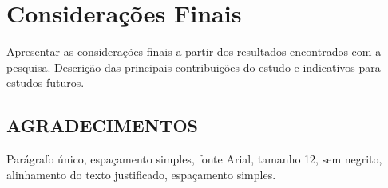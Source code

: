 \section{Considerações Finais}

Apresentar as considerações finais a partir dos resultados encontrados com a pesquisa. Descrição das principais contribuições do estudo e indicativos para estudos futuros. 

\subsection{AGRADECIMENTOS} %
Parágrafo único, espaçamento simples, fonte Arial, tamanho 12, sem negrito, alinhamento do texto justificado, espaçamento simples. 

